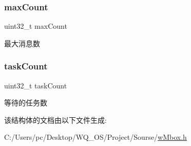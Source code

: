 \subsubsection{\texorpdfstring{max\+Count}{maxCount}}
{\footnotesize\ttfamily uint32\+\_\+t max\+Count}

最大消息数 \mbox{\label{struct__w_mbox_info_a80462c64b9184115aa568f08227f7f4a}} 
\subsubsection{\texorpdfstring{task\+Count}{taskCount}}
{\footnotesize\ttfamily uint32\+\_\+t task\+Count}

等待的任务数 

该结构体的文档由以下文件生成\+:\begin{DoxyCompactItemize}
\item 
C\+:/\+Users/pc/\+Desktop/\+W\+Q\+\_\+\+O\+S/\+Project/\+Sourse/\mbox{\hyperlink{w_mbox_8h}{w\+Mbox.\+h}}\end{DoxyCompactItemize}
